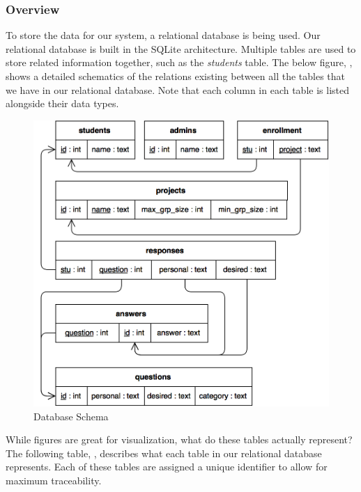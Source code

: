 \documentclass[12pt,letterpaper]{article}
\begin{document}
\subsubsection{Overview}

To store the data for our system, a relational database is being used. Our relational database is built in the SQLite architecture. Multiple tables are used to store related information together, such as the \textit{students} table. The below figure, , shows a detailed schematics of the relations existing between all the tables that we have in our relational database. Note that each column in each table is listed alongside their data types.

\begin{figure}[H]
	\centering{}
	\includegraphics[scale=0.35]{imgs/d3/db/database-schema-diagram.png}
	\caption{Database Schema}
\end{figure}

While figures are great for visualization, what do these tables actually represent? The following table, , describes what each table in our relational database represents. Each of these tables are assigned a unique identifier to allow for maximum traceability.
\end{document}

